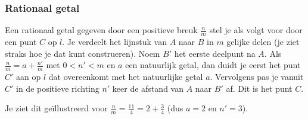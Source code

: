 \begin{center}
		
\end{center}




\subsubsection{Rationaal getal}

Een rationaal getal gegeven door een positieve breuk $\frac{n}{m}$ stel je als volgt voor door een punt $C$ op $l$.
Je verdeelt het lijnstuk van $A$ naar $B$ in $m$ gelijke delen (je ziet straks hoe je dat kunt construeren).
Noem $B'$ het eerste deelpunt na $A$.
Als $\frac{n}{m}=a+\frac{n'}{m}$ met $0<n'<m$ en $a$ een natuurlijk getal, dan duidt je eerst het punt $C'$ aan op $l$ dat overeenkomt met het natuurlijke getal $a$.
Vervolgens pas je vanuit $C'$ in de positieve richting $n'$ keer de afstand van $A$ naar $B'$ af.
Dit is het punt $C$.

Je ziet dit ge\"illustreerd voor $\frac{n}{m}=\frac{11}{4}=2+\frac{3}{4}$ (dus $a=2$ en $n'=3$).\vspace{5mm}


%


